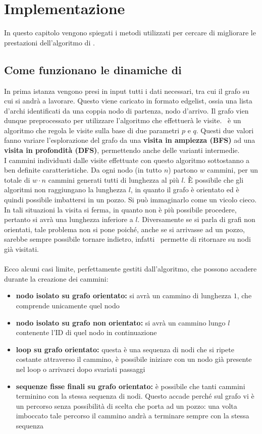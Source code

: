 %
%
%
\chapter{Implementazione}\label{chap:1}
In questo capitolo vengono spiegati i metodi utilizzati per cercare di migliorare le prestazioni dell'algoritmo di \cnrl \cite{CNRL_code}.
%
\section{Come funzionano le dinamiche di \cnrl}
In prima istanza vengono presi in input tutti i dati necessari, tra cui il grafo su cui si andrà a lavorare. Questo viene caricato in formato edgelist, ossia una lista d'archi identificati da una coppia nodo di partenza, nodo d'arrivo. Il grafo vien dunque preprocessato per utilizzare l'algoritmo \textbf{\nv} che effettuerà le visite. \nv\ è un algoritmo che regola le visite sulla base di due parametri $p$ e $q$. Questi due valori fanno variare l'esplorazione del grafo da una \textbf{visita in ampiezza (BFS)} ad una \textbf{visita in profondità (DFS)}, permettendo anche delle varianti intermedie.\\
I cammini individuati dalle visite effettuate con questo algoritmo sottostanno a ben definite caratteristiche. Da ogni nodo (in tutto $n$) partono $w$ cammini, per un totale di $w \cdot n$ cammini generati tutti di lunghezza al più $l$. È possibile che gli algoritmi non raggiungano la lunghezza $l$, in quanto il grafo è orientato ed è quindi possibile imbattersi in un pozzo. Si può immaginarlo come un vicolo cieco. In tali situazioni la visita si ferma, in quanto non è più possibile procedere, pertanto si avrà una lunghezza inferiore a $l$. Diversamente se si parla di grafi non orientati, tale problema non si pone poiché, anche se si arrivasse ad un pozzo, sarebbe sempre possibile tornare indietro, infatti \nv\ permette di ritornare su nodi già visitati.\\
\\
Ecco alcuni casi limite, perfettamente gestiti dall'algoritmo, che possono accadere durante la creazione dei cammini:
\begin{itemize}
	\item \textbf{nodo isolato su grafo orientato:} si avrà un cammino di lunghezza $1$, che comprende unicamente quel nodo
	\item \textbf{nodo isolato su grafo non orientato:} si avrà un cammino lungo $l$ contenente l'ID di quel nodo in continuazione
	\item \textbf{loop su grafo orientato:} questa è una sequenza di nodi che si ripete costante attraverso il cammino, è possibile iniziare con un nodo già presente nel loop o arrivarci dopo svariati passaggi
	\item \textbf{sequenze fisse finali su grafo orientato:} è possibile che tanti cammini terminino con la stessa sequenza di nodi. Questo accade perché sul grafo vi è un percorso senza possibilità di scelta che porta ad un pozzo: una volta imboccato tale percorso il cammino andrà a terminare sempre con la stessa sequenza
\end{itemize}
